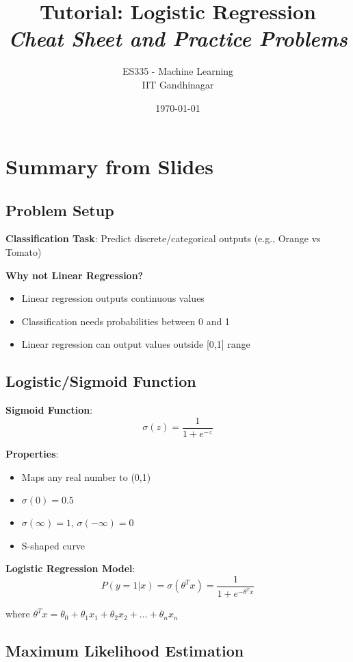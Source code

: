 \documentclass{article}
\title{\textbf{Tutorial: Logistic Regression} \\ \textit{Cheat Sheet and Practice Problems}}
\author{ES335 - Machine Learning \\ IIT Gandhinagar}
\date{\today}
\begin{document}
\maketitle

\section{Summary from Slides}

\subsection{Problem Setup}

\textbf{Classification Task}: Predict discrete/categorical outputs (e.g., Orange vs Tomato)

\textbf{Why not Linear Regression?}
\begin{itemize}
    \item Linear regression outputs continuous values
    \item Classification needs probabilities between 0 and 1
    \item Linear regression can output values outside [0,1] range
\end{itemize}

\subsection{Logistic/Sigmoid Function}

\textbf{Sigmoid Function}:
$$\sigma(z) = \frac{1}{1 + e^{-z}}$$

\textbf{Properties}:
\begin{itemize}
    \item Maps any real number to (0,1)
    \item $\sigma(0) = 0.5$
    \item $\sigma(\infty) = 1$, $\sigma(-\infty) = 0$
    \item S-shaped curve
\end{itemize}

\textbf{Logistic Regression Model}:
$$P(y=1|x) = \sigma(\theta^T x) = \frac{1}{1 + e^{-\theta^T x}}$$

where $\theta^T x = \theta_0 + \theta_1 x_1 + \theta_2 x_2 + ... + \theta_n x_n$

\subsection{Maximum Likelihood Estimation}
\end{document}
